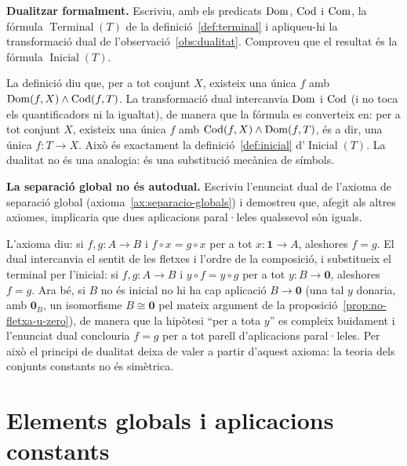 \begin{exercici}
\textbf{Dualitzar formalment.} Escriviu, amb els predicats \(\operatorname{Dom}\), \(\operatorname{Cod}\) i \(\operatorname{Com}\), la fórmula \(\operatorname{Terminal}(T)\) de la definició~\ref{def:terminal} i apliqueu-hi la transformació dual de l'observació~\ref{obs:dualitat}. Comproveu que el resultat és la fórmula \(\operatorname{Inicial}(T)\).
\end{exercici}
\begin{solucio}
La definició diu que, per a tot conjunt \(X\), existeix una única \(f\) amb \(\operatorname{Dom}(f,X)\land\operatorname{Cod}(f,T)\). La transformació dual intercanvia \(\operatorname{Dom}\) i \(\operatorname{Cod}\) (i no toca els quantificadors ni la igualtat), de manera que la fórmula es converteix en: per a tot conjunt \(X\), existeix una única \(f\) amb \(\operatorname{Cod}(f,X)\land\operatorname{Dom}(f,T)\), és a dir, una única \(f\colon T\to X\). Això és exactament la definició~\ref{def:inicial} d'\(\operatorname{Inicial}(T)\). La dualitat no és una analogia: és una substitució mecànica de símbols.
\end{solucio}

\begin{exercici}
\textbf{La separació global no és autodual.} Escriviu l'enunciat dual de l'axioma de separació global (axioma~\ref{ax:separacio-globals}) i demostreu que, afegit als altres axiomes, implicaria que dues aplicacions paral·leles qualssevol són iguals.
\end{exercici}
\begin{solucio}
L'axioma diu: si \(f,g\colon A\to B\) i \(f\circ x=g\circ x\) per a tot \(x\colon\mathbf1\to A\), aleshores \(f=g\). El dual intercanvia el sentit de les fletxes i l'ordre de la composició, i substitueix el terminal per l'inicial: si \(f,g\colon A\to B\) i \(y\circ f=y\circ g\) per a tot \(y\colon B\to\mathbf0\), aleshores \(f=g\). Ara bé, si \(B\) no és inicial no hi ha cap aplicació \(B\to\mathbf0\) (una tal \(y\) donaria, amb \(\mathbf0_B\), un isomorfisme \(B\cong\mathbf0\) pel mateix argument de la proposició~\ref{prop:no-fletxa-u-zero}), de manera que la hipòtesi \enquote{per a tota \(y\)} es compleix buidament i l'enunciat dual conclouria \(f=g\) per a tot parell d'aplicacions paral·leles. Per això el principi de dualitat deixa de valer a partir d'aquest axioma: la teoria dels conjunts constants no és simètrica.
\end{solucio}

\section{Elements globals i aplicacions constants}\label{prac:constants}


